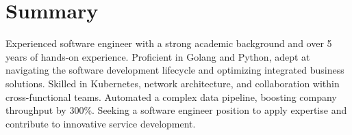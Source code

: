 \section{Summary}\closesection{}

Experienced software engineer with a strong academic background and over 5 years of hands-on experience.
Proficient in Golang and Python, adept at navigating the software development lifecycle and optimizing integrated business solutions.
Skilled in Kubernetes, network architecture, and collaboration within cross-functional teams.
Automated a complex data pipeline, boosting company throughput by 300\%.
Seeking a software engineer position to apply expertise and contribute to innovative service development.